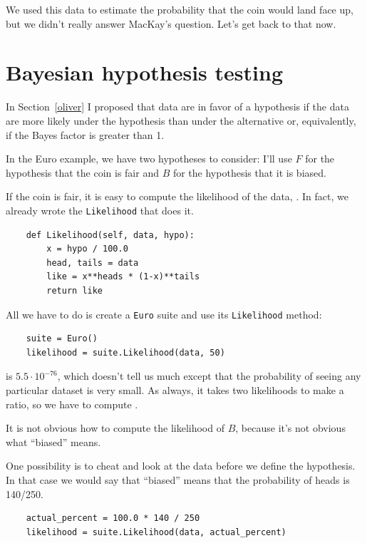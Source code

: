 \documentclass[12pt]{book}
\begin{document}
We used this data to estimate the probability that the coin would
land face up, but we didn't really answer MacKay's question.  Let's
get back to that now.

\section{Bayesian hypothesis testing}

In Section~\ref{oliver} I proposed that data are in favor of
a hypothesis if the data are more likely under the hypothesis than
under the alternative or, equivalently, if the Bayes factor is greater
than 1.

In the Euro example, we have two hypotheses to consider: I'll use
$F$ for the hypothesis that the coin is fair and $B$ for the hypothesis
that it is biased.

If the coin is fair, it is easy to compute the likelihood of the
data, .  In fact, we already wrote the {\tt Likelihood}
that does it.

\begin{verbatim}
    def Likelihood(self, data, hypo):
        x = hypo / 100.0
        head, tails = data
        like = x**heads * (1-x)**tails
        return like
\end{verbatim}

All we have to do is create a {\tt Euro} suite and use its 
{\tt Likelihood} method:

\begin{verbatim}
    suite = Euro()
    likelihood = suite.Likelihood(data, 50)
\end{verbatim}

 is $5.5 \cdot 10^{-76}$, which doesn't tell us much except
that the probability of seeing any particular dataset is very small.
As always, it takes two likelihoods to make a ratio, so we have to
compute .

It is not obvious how to compute the likelihood of $B$, because
it's not obvious what ``biased'' means.

One possibility is to cheat and look at the data before we define
the hypothesis.  In that case we would say that ``biased'' means that
the probability of heads is 140/250.

\begin{verbatim}
    actual_percent = 100.0 * 140 / 250
    likelihood = suite.Likelihood(data, actual_percent)
\end{verbatim}
\end{document}
